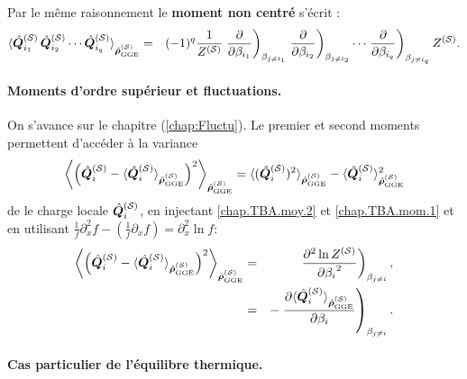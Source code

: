 Par le même raisonnement le {\bf moment non centré} s'écrit :
\begin{eqnarray}
	\braket{ \hat{\bm{Q}}_{i_1}^{(\mathcal{S})} \, \hat{\bm{Q}}_{i_2}^{(\mathcal{S})} \cdots \hat{\bm{Q}}_{i_q}^{(\mathcal{S})} }_{\hat{\bm{\rho}}^{(\mathcal{S})}_{\mathrm{GGE}}} &= &  (-1)^q \frac{1}{Z^{(\mathcal{S})}} \left.\frac{\partial}{\partial \beta_{i_1}} \right )_{\beta_{j \neq i_1 }} \left.\frac{\partial}{\partial \beta_{i_2}} \right )_{\beta_{j \neq i_2 }} \cdots \left.\frac{\partial}{\partial \beta_{i_q}} \right )_{\beta_{j \neq i_q }} Z^{(\mathcal{S})} \label{chap.TBA.mom.1}.	
\end{eqnarray}

\paragraph{Moments d’ordre supérieur et fluctuations.} On s'avance sur le chapitre (\ref{chap:Fluctu}).
Le premier et second moments permettent d’accéder à la variance 
\begin{eqnarray}
	 \left \langle \left (\hat{\bm{Q}}_i^{(\mathcal{S})} - \langle\hat{\bm{Q}}_i^{(\mathcal{S})} \rangle_{\hat{\bm{\rho}}^{(\mathcal{S})}_{\mathrm{GGE}}} \right )^2  \right \rangle_{\hat{\bm{\rho}}^{(\mathcal{S})}_{\mathrm{GGE}}} = \langle(\hat{\bm{Q}}_i^{(\mathcal{S})})^2 \rangle_{\hat{\bm{\rho}}^{(\mathcal{S})}_{\mathrm{GGE}}}  -  \langle\hat{\bm{Q}}_i^{(\mathcal{S})} \rangle_{\hat{\bm{\rho}}^{(\mathcal{S})}_{\mathrm{GGE}}}^2	
\end{eqnarray}
de le charge locale $\hat{\bm{Q}}_i^{(\mathcal{S})}$, en injectant \eqref{chap.TBA.moy.2} et \eqref{chap.TBA.mom.1} et en utilisant $\frac{1}{f} \partial_x^2 f - ( \frac{1}{f} \partial_x f ) = \partial_x^2 \ln f  $:
\begin{eqnarray}
	\left \langle \left (\hat{\bm{Q}}_i^{(\mathcal{S})} - \langle\hat{\bm{Q}}_i^{(\mathcal{S})} \rangle_{\hat{\bm{\rho}}^{(\mathcal{S})}_{\mathrm{GGE}}} \right )^2  \right \rangle_{\hat{\bm{\rho}}^{(\mathcal{S})}_{\mathrm{GGE}}}  &=&	  \left . \frac{\partial^2 \ln Z^{(\mathcal{S})}  }{{\partial \beta_i}^2 }  \right )_{\beta_{j\neq i}},\\
	& = &  - \left . 	\frac{\partial \langle\hat{\bm{Q}}_i^{(\mathcal{S})} \rangle_{\hat{\bm{\rho}}^{(\mathcal{S})}_{\mathrm{GGE}}} }{\partial \beta_i } \right )_{\beta_{j\neq i}}.	
\end{eqnarray}

\paragraph{Cas particulier de l’équilibre thermique.}


